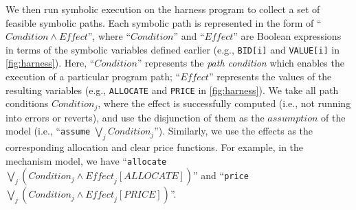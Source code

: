 We then run symbolic execution on the harness program to collect a set of feasible symbolic paths.
Each symbolic path is represented in the form of ``$\mathit{Condition} \wedge \mathit{Effect}$'',
where ``$\mathit{Condition}$'' and ``$\mathit{Effect}$'' are Boolean expressions in terms of the
symbolic variables defined earlier (e.g., \texttt{BID[i]} and \texttt{VALUE[i]} in
\cref{fig:harness}).
Here, ``$\mathit{Condition}$'' represents the \emph{path condition} which enables the execution of a
particular program path; ``$\mathit{Effect}$'' represents the values of the resulting variables
(e.g., \texttt{ALLOCATE} and \texttt{PRICE} in \cref{fig:harness}).
We take all path conditions $\mathit{Condition}_j$, where the effect is successfully computed
(i.e., not running into errors or reverts), and use the disjunction of them as the
$\mathit{assumption}$ of the model (i.e., ``\texttt{assume} $\bigvee_j \mathit{Condition}_j$'').
Similarly, we use the effects as the corresponding allocation and clear price functions.
For example, in the mechanism model, we have ``\texttt{allocate} $\bigvee_j (Condition_j \wedge
\mathit{Effect}_j[ALLOCATE])$'' and ``\texttt{price} $\bigvee_j (\mathit{Condition}_j \wedge
\mathit{Effect}_j[PRICE])$''.

%


